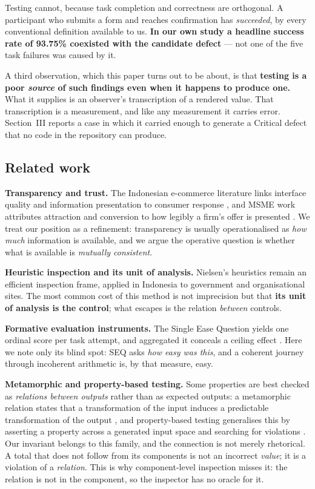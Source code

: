 \documentclass[conference]{IEEEtran}
\begin{document}
Testing cannot, because task completion and correctness are orthogonal. A participant who submits a form
and reaches confirmation has \emph{succeeded}, by every conventional definition available to us.
\textbf{In our own study a headline success rate of 93.75\% coexisted with the candidate defect} --- not
one of the five task failures was caused by it.

A third observation, which this paper turns out to be about, is that \textbf{testing is a poor
\emph{source} of such findings even when it happens to produce one.} What it supplies is an observer's
transcription of a rendered value. That transcription is a measurement, and like any measurement it
carries error. Section~III reports a case in which it carried enough to generate a Critical defect that
no code in the repository can produce.

\subsection{Related work}

\textbf{Transparency and trust.} The Indonesian e-commerce literature links interface quality and
information presentation to consumer response \cite{dinata2023,sunarso2023}, and MSME work attributes
attraction and conversion to how legibly a firm's offer is presented \cite{tianti2024,sunarso2023}.
We treat our position as a refinement: transparency is usually operationalised as \emph{how much}
information is available, and we argue the operative question is whether what is available is
\emph{mutually consistent}.

\textbf{Heuristic inspection and its unit of analysis.} Nielsen's heuristics \cite{nielsen1994} remain
an efficient inspection frame, applied in Indonesia to government \cite{perdanakusuma2022} and
organisational \cite{febriyanthi2021} sites. The most common cost of this method is not imprecision but
that \textbf{its unit of analysis is the control}; what escapes is the relation \emph{between} controls.

\textbf{Formative evaluation instruments.} The Single Ease Question \cite{sauro2016} yields one
ordinal score per task attempt, and aggregated it conceals a ceiling effect
\cite{braniwati2026dispersion}. Here we note only its blind spot: SEQ asks \emph{how easy was this},
and a coherent journey through incoherent arithmetic is, by that measure, easy.

\textbf{Metamorphic and property-based testing.} Some properties are best checked as \emph{relations
between outputs} rather than as expected outputs: a metamorphic relation states that a transformation
of the input induces a predictable transformation of the output \cite{chen2003}, and property-based
testing generalises this by asserting a property across a generated input space and searching for
violations \cite{claessen2000}. Our invariant belongs to this family, and the connection is not merely
rhetorical. A total that does not follow from its components is not an incorrect \emph{value}; it is a
violation of a \emph{relation}. This is why component-level inspection misses it: the relation is not in
the component, so the inspector has no oracle for it.
\end{document}
